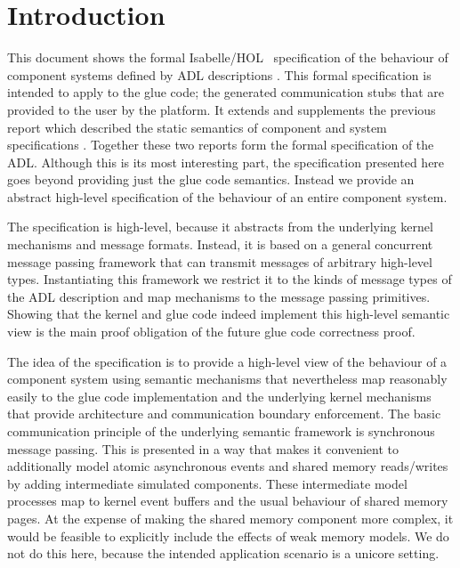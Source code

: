 %
%
%
%

\chapter{Introduction}
\label{s:intro}

This document shows the formal Isabelle/HOL~\cite{Nipkow_PW:Isabelle}
specification of the behaviour of \camkes
component systems defined by ADL descriptions \cite{Kuz_LGH_07}.
This formal specification is intended to apply to the glue code; the generated
communication stubs that are provided to the user by the \camkes platform.
It extends and supplements the previous
report which described the static semantics of component and system
specifications \cite{Kuz_FKM_12}.
Together these two reports form the formal specification of the \camkes ADL.
Although this is its most interesting part, the specification presented here
goes beyond providing just the glue code semantics. Instead we provide an
abstract high-level specification of the behaviour of an entire \camkes
component system.

The specification is high-level, because it abstracts from the underlying
kernel mechanisms and message formats. Instead, it is based on a general
concurrent message passing framework that can transmit messages of arbitrary
high-level types. Instantiating this framework we restrict it to the kinds of
message types of the ADL description and map \camkes mechanisms to the
message passing primitives. Showing that the kernel and glue code indeed
implement this high-level semantic view is the main proof obligation of the
future glue code correctness proof.

The idea of the specification is to provide a high-level view of the behaviour
of a component system using semantic mechanisms that nevertheless map
reasonably easily to the glue code implementation and the underlying kernel
mechanisms that provide architecture and communication boundary enforcement.
The basic communication principle of the underlying semantic framework is
synchronous message passing. This is presented in a way that makes it convenient to
additionally model atomic asynchronous events and shared memory reads/writes by
adding intermediate simulated components. These intermediate model processes map to
kernel event buffers and the usual behaviour of shared memory
pages. At the expense of making the shared memory component more complex, it
would be feasible to explicitly include the effects of
weak memory models. We do not do this here, because the intended application
scenario is a unicore setting.

